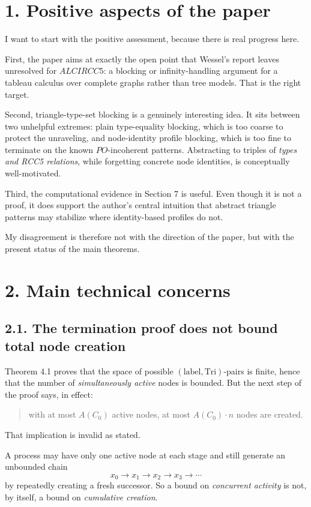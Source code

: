 \documentclass[11pt]{article}
\newcommand{\Tri}{\mathrm{Tri}}
\begin{document}
\section*{1. Positive aspects of the paper}

I want to start with the positive assessment, because there is real progress here.

First, the paper aims at exactly the open point that Wessel's report leaves unresolved for \(ALCIRCC5\): a blocking or infinity-handling argument for a tableau calculus over complete graphs rather than tree models. That is the right target.

Second, triangle-type-set blocking is a genuinely interesting idea. It sits between two unhelpful extremes: plain type-equality blocking, which is too coarse to protect the unraveling, and node-identity profile blocking, which is too fine to terminate on the known \(PO\)-incoherent patterns. Abstracting to triples of \emph{types and RCC5 relations}, while forgetting concrete node identities, is conceptually well-motivated.

Third, the computational evidence in Section 7 is useful. Even though it is not a proof, it does support the author's central intuition that abstract triangle patterns may stabilize where identity-based profiles do not.

My disagreement is therefore not with the direction of the paper, but with the present status of the main theorems.

\section*{2. Main technical concerns}

\subsection*{2.1. The termination proof does not bound total node creation}

Theorem 4.1 proves that the space of possible \((\text{label},\Tri)\)-pairs is finite, hence that the number of \emph{simultaneously active} nodes is bounded. But the next step of the proof says, in effect:
\begin{quote}
with at most \(A(C_0)\) active nodes, at most \(A(C_0)\cdot n\) nodes are created.
\end{quote}
That implication is invalid as stated.

A process may have only one active node at each stage and still generate an unbounded chain
\[
x_0 \to x_1 \to x_2 \to x_3 \to \cdots
\]
by repeatedly creating a fresh successor. So a bound on \emph{concurrent activity} is not, by itself, a bound on \emph{cumulative creation}.
\end{document}
